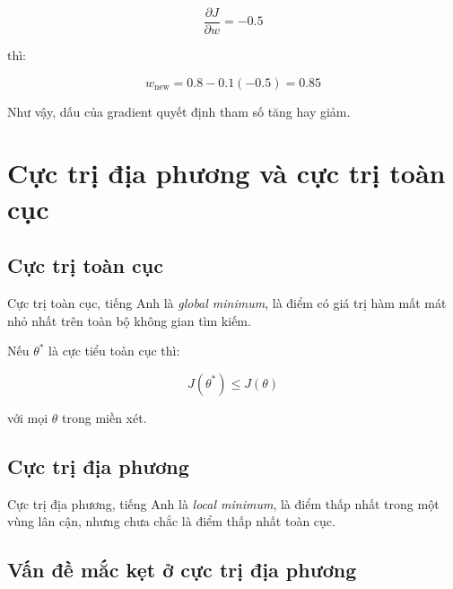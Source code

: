 \[
    \frac{\partial J}{\partial w}=-0.5
\]

thì:

\[
    w_{\text{new}}
    =
    0.8 - 0.1(-0.5)
    =
    0.85
\]

Như vậy, dấu của gradient quyết định tham số tăng hay giảm.

\section{Cực trị địa phương và cực trị toàn cục}

\subsection{Cực trị toàn cục}

Cực trị toàn cục, tiếng Anh là \textit{global minimum}, là điểm có giá trị hàm mất mát nhỏ nhất trên toàn bộ không gian tìm kiếm.

Nếu $\theta^*$ là cực tiểu toàn cục thì:

\[
    J(\theta^*) \leq J(\theta)
\]

với mọi $\theta$ trong miền xét.

\subsection{Cực trị địa phương}

Cực trị địa phương, tiếng Anh là \textit{local minimum}, là điểm thấp nhất trong một vùng lân cận, nhưng chưa chắc là điểm thấp nhất toàn cục.

\begin{center}
\end{center}

\subsection{Vấn đề mắc kẹt ở cực trị địa phương}

